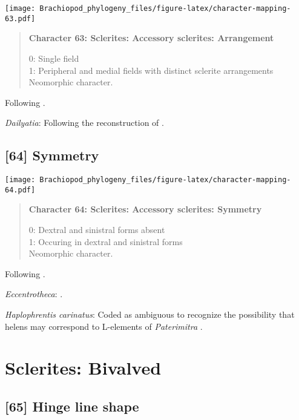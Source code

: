 \documentclass[openany]{book}
\theoremstyle{definition}
\theoremstyle{definition}
\theoremstyle{definition}
\theoremstyle{remark}
\begin{document}
\texttt{[image: Brachiopod\_phylogeny\_files/figure-latex/character-mapping-63.pdf]}

\begin{quote}
\textbf{Character 63: Sclerites: Accessory sclerites: Arrangement}

0: Single field\\
1: Peripheral and medial fields with distinct sclerite arrangements\\
Neomorphic character.
\end{quote}

Following \citet{Zhao2017}.

\hypertarget{Dailyatia-coding-63}{}
\emph{Dailyatia}: Following the reconstruction of
\citet{Skovsted2015Theearly}.

\subsection*{{[}64{]} Symmetry}\label{symmetry}

\texttt{[image: Brachiopod\_phylogeny\_files/figure-latex/character-mapping-64.pdf]}

\begin{quote}
\textbf{Character 64: Sclerites: Accessory sclerites: Symmetry}

0: Dextral and sinistral forms absent\\
1: Occuring in dextral and sinistral forms\\
Neomorphic character.
\end{quote}

Following \citet{Zhao2017}.

\hypertarget{Eccentrotheca-coding-64}{}
\emph{Eccentrotheca}: \citet{Skovsted2008Thescleritome}.

\hypertarget{Haplophrentis_carinatus-coding-64}{}
\emph{Haplophrentis carinatus}: Coded as ambiguous to recognize the
possibility that helens may correspond to L-elements of
\emph{Paterimitra} \citep{Moysiuk2017Hyolithsare}.

\section{Sclerites: Bivalved}\label{sclerites-bivalved}

\subsection*{{[}65{]} Hinge line shape}\label{hinge-line-shape}
\end{document}
